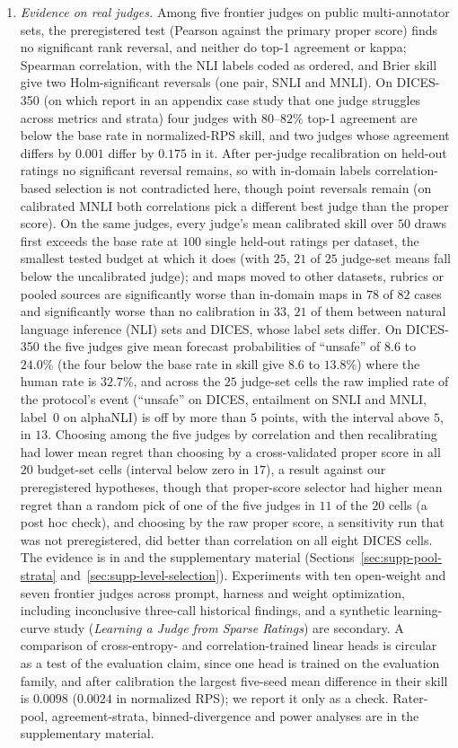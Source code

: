 \begin{enumerate}
\item \emph{Evidence on real judges.} Among five frontier judges on public multi-annotator sets, the preregistered test (Pearson against the primary proper score) finds no significant rank reversal, and neither do top-1 agreement or kappa; Spearman correlation, with the NLI labels coded as ordered, and Brier skill give two Holm-significant reversals (one pair, SNLI and MNLI). On DICES-350 (on which \citet{elangovan2025beyond} report in an appendix case study that one judge struggles across metrics and strata) four judges with $80$--$82\%$ top-1 agreement are below the base rate in normalized-RPS skill, and two judges whose agreement differs by $0.001$ differ by $0.175$ in it. After per-judge recalibration on held-out ratings no significant reversal remains, so with in-domain labels correlation-based selection is not contradicted here, though point reversals remain (on calibrated MNLI both correlations pick a different best judge than the proper score). On the same judges, every judge's mean calibrated skill over $50$ draws first exceeds the base rate at $100$ single held-out ratings per dataset, the smallest tested budget at which it does (with $25$, $21$ of $25$ judge-set means fall below the uncalibrated judge); and maps moved to other datasets, rubrics or pooled sources are significantly worse than in-domain maps in $78$ of $82$ cases and significantly worse than no calibration in $33$, $21$ of them between natural language inference (NLI) sets and DICES, whose label sets differ. On DICES-350 the five judges give mean forecast probabilities of ``unsafe'' of $8.6$ to $24.0\%$ (the four below the base rate in skill give $8.6$ to $13.8\%$) where the human rate is $32.7\%$, and across the $25$ judge-set cells the raw implied rate of the protocol's event (``unsafe'' on DICES, entailment on SNLI and MNLI, label~$0$ on alphaNLI) is off by more than $5$ points, with the interval above $5$, in $13$. Choosing among the five judges by correlation and then recalibrating had lower mean regret than choosing by a cross-validated proper score in all $20$ budget-set cells (interval below zero in $17$), a result against our preregistered hypotheses, though that proper-score selector had higher mean regret than a random pick of one of the five judges in $11$ of the $20$ cells (a post hoc check), and choosing by the raw proper score, a sensitivity run that was not preregistered, did better than correlation on all eight DICES cells. The evidence is in  and the supplementary material\ifsupplementary{} (Sections~\ref{sec:supp-pool-strata} and~\ref{sec:supp-level-selection})\fi. Experiments with ten open-weight and seven frontier judges across prompt, harness and weight optimization, including inconclusive three-call historical findings, and a synthetic learning-curve study (\emph{Learning a Judge from Sparse Ratings}) are secondary. A comparison of cross-entropy- and correlation-trained linear heads is circular as a test of the evaluation claim, since one head is trained on the evaluation family, and after calibration the largest five-seed mean difference in their skill is $0.0098$ ($0.0024$ in normalized RPS); we report it only as a check. Rater-pool, agreement-strata, binned-divergence and power analyses are in the supplementary material.
\end{enumerate}

